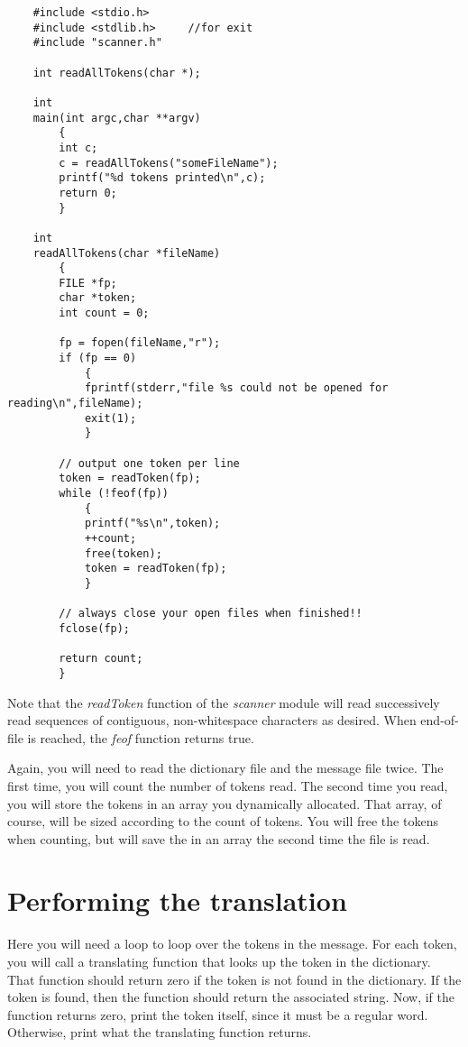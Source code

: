 \documentclass[12pt]{article}
\begin{document}
\begin{verbatim}
    #include <stdio.h>
    #include <stdlib.h>     //for exit
    #include "scanner.h"

    int readAllTokens(char *);

    int
    main(int argc,char **argv)
        {
        int c;
        c = readAllTokens("someFileName");
        printf("%d tokens printed\n",c);
        return 0;
        }

    int
    readAllTokens(char *fileName)
        {
        FILE *fp;
        char *token;
        int count = 0;
        
        fp = fopen(fileName,"r");
        if (fp == 0)
            {
            fprintf(stderr,"file %s could not be opened for reading\n",fileName);
            exit(1);
            }

        // output one token per line
        token = readToken(fp);
        while (!feof(fp))
            {
            printf("%s\n",token);
            ++count;
            free(token);
            token = readToken(fp);
            }

        // always close your open files when finished!!
        fclose(fp);

        return count;
        }
\end{verbatim}

Note that the {\it readToken} function of the {\it scanner}
module will read
successively read sequences of contiguous, non-whitespace
characters as desired. When end-of-file is reached, the {\it feof}
function returns true.

Again, you will need to read the dictionary file and the message
file twice. The first time,
you will count the number of tokens read. The second time you read, you will
store the tokens in an array you dynamically allocated. That array,
of course, will be sized according to the count of tokens.
You will free the tokens when counting, but will save the
in an array the second time the file is read.

\section*{Performing the translation}

Here you will need a loop to loop over the tokens in the
message. For each token, you will call a translating function that 
looks up the token in the dictionary. That function should
return zero if the token is not found in the dictionary.
If the token is found, then the function should return the
associated string.
Now, if the function returns zero, print the token itself,
since it must be a regular word. Otherwise, print what the
translating function returns.
\end{document}
